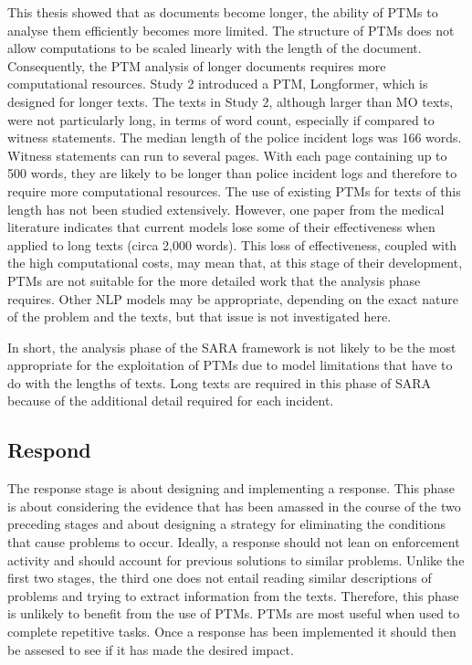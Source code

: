 This thesis showed that as documents become longer, the ability of PTMs to analyse them efficiently becomes more limited. The structure of PTMs does not allow computations to be scaled linearly with the length of the document. Consequently, the PTM analysis of longer documents requires more computational resources. Study 2 introduced a PTM, Longformer, which is designed for longer texts. The texts in Study 2, although larger than MO texts, were not particularly long, in terms of word count, especially if compared to witness statements. The median length of the police incident logs was 166 words. Witness statements can run to several pages. With each page containing up to 500 words, they are likely to be longer than police incident logs and therefore to require more computational resources. The use of existing PTMs for texts of this length has not been studied extensively. However, one paper from the medical literature \parencite{limitations_of_transformers}  indicates that current models lose some of their effectiveness when applied to long texts (circa 2,000 words). This loss of effectiveness, coupled with the high computational costs, may mean that, at this stage of their development, PTMs are not suitable for the more detailed work that the analysis phase requires. Other NLP models may be appropriate, depending on the exact nature of the problem and the texts, but that issue is not investigated here.

In short, the analysis phase of the SARA framework is not likely to be the most appropriate for the exploitation of PTMs due to model limitations that have to do with the lengths of texts. Long texts are required in this phase of SARA because of the additional detail required for each incident.


\subsection{Respond} The response stage is about designing and implementing a response. This phase is about considering the evidence that has been amassed in the course of the two preceding stages and about designing a strategy for eliminating the conditions that cause problems to occur. Ideally, a response should not lean on enforcement activity and should account for previous solutions to similar problems. Unlike the first two stages, the third one does not entail reading similar descriptions of problems and trying to extract information from the texts. Therefore, this phase is unlikely to benefit from the use of PTMs. PTMs are most useful when used to complete repetitive tasks. Once a response has been implemented it should then be assesed to see if it has made the desired impact. 

